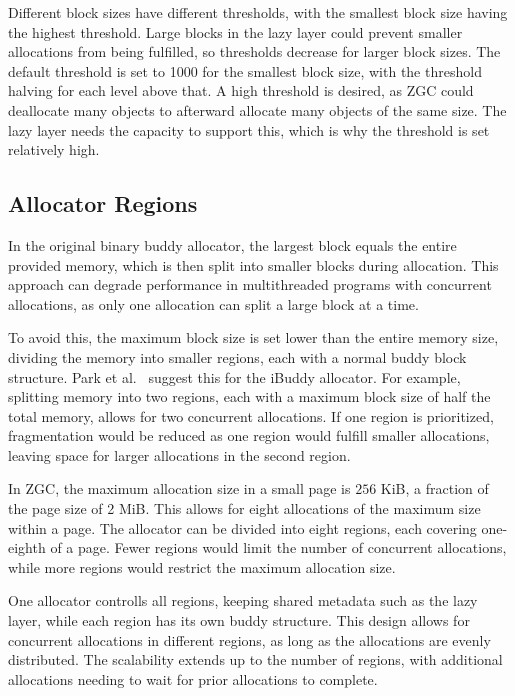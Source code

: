 Different block sizes have different thresholds, with the smallest block size having the highest threshold. Large blocks in the lazy layer could prevent smaller allocations from being fulfilled, so thresholds decrease for larger block sizes. The default threshold is set to 1000 for the smallest block size, with the threshold halving for each level above that. A high threshold is desired, as ZGC could deallocate many objects to afterward allocate many objects of the same size. The lazy layer needs the capacity to support this, which is why the threshold is set relatively high.

\subsection{Allocator Regions} \label{sec:concurrencyexpl}
In the original binary buddy allocator, the largest block equals the entire provided memory, which is then split into smaller blocks during allocation. This approach can degrade performance in multithreaded programs with concurrent allocations, as only one allocation can split a large block at a time.

To avoid this, the maximum block size is set lower than the entire memory size, dividing the memory into smaller regions, each with a normal buddy block structure. Park et al.~\cite{park2014ibuddy} suggest this for the iBuddy allocator. For example, splitting memory into two regions, each with a maximum block size of half the total memory, allows for two concurrent allocations. If one region is prioritized, fragmentation would be reduced as one region would fulfill smaller allocations, leaving space for larger allocations in the second region.

In ZGC, the maximum allocation size in a small page is $256$ KiB, a fraction of the page size of 2 MiB. This allows for eight allocations of the maximum size within a page. The allocator can be divided into eight regions, each covering one-eighth of a page. Fewer regions would limit the number of concurrent allocations, while more regions would restrict the maximum allocation size.

One allocator controlls all regions, keeping shared metadata such as the lazy layer, while each region has its own buddy structure. This design allows for concurrent allocations in different regions, as long as the allocations are evenly distributed. The scalability extends up to the number of regions, with additional allocations needing to wait for prior allocations to complete.

